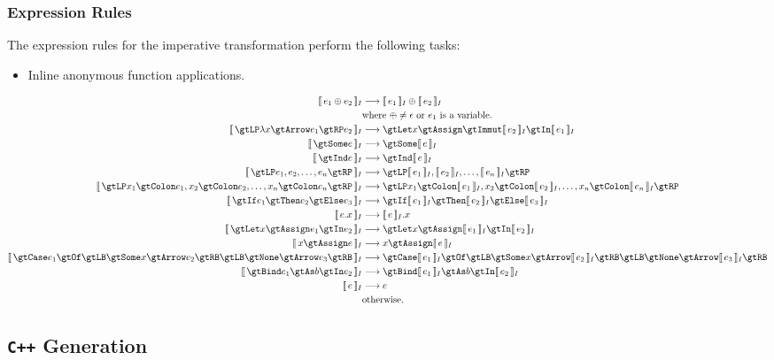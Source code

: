 \documentclass[10pt]{article}
\begin{document}
\subsubsection{Expression Rules}

The expression rules for the imperative transformation perform the following tasks:

\begin{itemize}
    \item Inline anonymous function applications.
\end{itemize}
%
\begin{adjustwidth}{-0.5in}{-0.5in}\begin{align*}
    \eqI{e_1 \oplus e_2}{\intI{e_1} \oplus \intI{e_2}}{where $\oplus \neq \epsilon$ or $e_1$ is a variable.} \\
    \eqI{\gtLP \lambda x \gtArrow e_1 \gtRP e_2}{\gtLet x \gtAssign \gtImmut \intI{e_2} \gtIn \intI{e_1}}{} \\
    \eqI{\gtSome e}{\gtSome \intI{e}}{} \\
    \eqI{\gtInd e}{\gtInd \intI{e}}{} \\
    \eqI{\gtLP e_1, e_2, \ldots, e_n \gtRP}{\gtLP \intI{e_1}, \intI{e_2}, \ldots, \intI{e_n} \gtRP}{} \\
    \eqI{\gtLP x_1 \gtColon e_1, x_2 \gtColon e_2, \ldots, x_n \gtColon e_n \gtRP}
        {\gtLP x_1 \gtColon \intI{e_1}, x_2 \gtColon \intI{e_2}, \ldots, x_n \gtColon \intI{e_n} \gtRP}{} \\
    \eqI{\gtIf e_1 \gtThen e_2 \gtElse e_3}{\gtIf \intI{e_1} \gtThen \intI{e_2} \gtElse \intI{e_3}}{} \\
    \eqI{e.x}{\intI{e}.x}{} \\
    \eqI{\gtLet x \gtAssign e_1 \gtIn e_2}{\gtLet x \gtAssign \intI{e_1} \gtIn \intI{e_2}}{} \\
    \eqI{x \gtAssign e}{x \gtAssign \intI{e}}{} \\
    \eqI{\gtCase e_1 \gtOf \gtLB \gtSome x \gtArrow e_2 \gtRB
            \gtLB \gtNone \gtArrow e_3 \gtRB}
        {\gtCase \intI{e_1} \gtOf \gtLB \gtSome x \gtArrow \intI{e_2} \gtRB
            \gtLB \gtNone \gtArrow \intI{e_3} \gtRB}
        {} \\
    \eqI{\gtBind e_1 \gtAs b \gtIn e_2}{\gtBind \intI{e_1} \gtAs b \gtIn \intI{e_2}}{} \\
    \eqI{e}{e}{otherwise.}
\end{align*}\end{adjustwidth}

\subsection{\texttt{C++} Generation}
\end{document}
